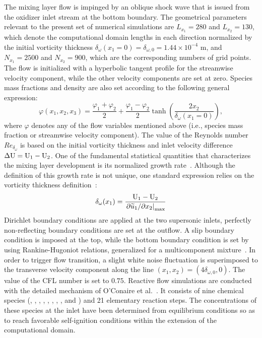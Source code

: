 \documentclass[conf]{new-aiaa}
\newcommand*{\dwz}{\delta_{\omega,0}}
\begin{document}
%
The mixing layer flow is impinged by an oblique shock wave that is issued from the oxidizer inlet stream at the bottom boundary.
%
The geometrical parameters relevant to the present set of numerical simulations are $L_{x_1}=280$ and $L_{x_2}=130$, which denote the computational domain lengths in each direction normalized by the initial vorticity thickness $\delta_{\omega}(x_1=0)=\dwz=1.44\times 10^{-4}$ m, and $N_{x_1}=2500$ and $N_{x_2}=900$, which are the corresponding numbers of grid points.
%
The flow is initialized with a hyperbolic tangent profile for the streamwise velocity component, while the other velocity components are set at zero. Species mass fractions and density are also set according to the following general expression:
%
\begin{equation}
\varphi(x_1,x_2,x_3)= \frac{\varphi_1+\varphi_2}{2}+\frac{\varphi_1-\varphi_2}{2}\tanh\left(\frac{2x_2}{\delta_\omega(x_1=0)}\right),
\end{equation}
%
where $\varphi$ denotes any of the flow variables mentioned above (i.e., species mass fraction or streamwise velocity component).
%
The value of the Reynolds number ${Re_{\delta_{\omega}}}$ is based on the initial vorticity thickness and inlet velocity difference $\Delta \ce{U}=\ce{U}_1-\ce{U}_2$. 
%
One of the fundamental statistical quantities that characterizes the mixing layer development is its normalized growth rate~\cite{ramshaw2000simple}.
%
Although the definition of this growth rate is not unique, one standard expression relies on the vorticity thickness definition~\cite{pantano2003mixing}:
%
\begin{equation}
\delta_{\omega}(x_1)=\frac{\ce{U}_1-\ce{U}_2}{\left. {\partial\widetilde{u}_1}/{\partial x_2}\right\vert_{\max}}
\end{equation}
%
Dirichlet boundary conditions are applied at the two supersonic inlets, perfectly non-reflecting boundary conditions are set at the outflow.
%
A slip boundary condition is imposed at the top, while the bottom boundary condition is set by using Rankine-Hugoniot relations, generalized for a multicomponent mixture~\cite{mitchell1982general}.
%
In order to trigger flow transition, a slight white noise fluctuation is superimposed to the transverse velocity component along the line $(x_1,x_2)=(4\dwz,0)$.
%
The value of the {CFL} number is set to $0.75$.
%
Reactive flow simulations are conducted with the detailed mechanism of O'Conaire et al.~\cite{o2004comprehensive}. It consists of nine chemical species (, , , , , , , , and ) and 21 elementary reaction steps.
%
The  concentrations of these species at the inlet have been determined from equilibrium conditions so as to reach favorable self-ignition conditions within the extension of the computational domain. 
\end{document}
